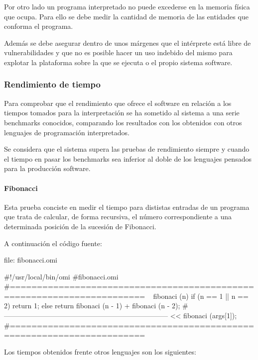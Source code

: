 Por otro lado un programa interpretado no puede excederse en la memoria física que ocupa. Para ello 
se debe medir la cantidad de memoria de las entidades que conforma el programa.

Además se debe asegurar dentro de unos márgenes que el intérprete está libre de vulnerabilidades 
y que no es posible hacer un uso indebido del mismo para explotar la plataforma sobre la que se
ejecuta o el propio sistema software.

\subsubsection{Rendimiento de tiempo}
Para comprobar que el rendimiento que ofrece el software en relación a los tiempos tomados para la interpretación 
se ha sometido al sistema a una serie benchmarks conocidos, comparando los resultados con los obtenidos con otros 
lenguajes de programación interpretados.

Se considera que el sistema supera las pruebas de rendimiento siempre y cuando el tiempo en pasar los benchmarks sea inferior al doble de
los lenguajes pensados para la producción software.

\paragraph{Fibonacci}
Esta prueba conciste en medir el tiempo para dististas entradas de un programa que trata de calcular, de forma recursiva, 
el número correspondiente a una determinada posición de la sucesión de Fibonacci. 

A continuación el código fuente:

file: fibonacci.omi
\begin{myverbatim}
#!/usr/local/bin/omi
#fibonacci.omi
#=======================================================================
~ fibonaci (n) {
   if (n == 1 || n == 2) 
      return 1;
   else 
      return fibonaci (n - 1) + fibonaci (n - 2); 
}
#-----------------------------------------------------------------------
<< fibonaci (args[1]);
#=======================================================================
\end{myverbatim}

Los tiempos obtenidos frente otros lenguajes son los siguientes: 

